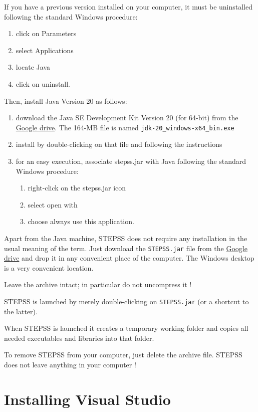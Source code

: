 If you have a previous version installed on your computer, it must be uninstalled following the standard Windows procedure:
\begin{enumerate}
\item click on Parameters
\item select Applications
\item locate Java
\item click on uninstall.
\end{enumerate}

Then, install Java Version 20 as follows:
\begin{enumerate}
\item download the Java SE Development Kit Version 20 (for 64-bit) from the \hyperlink{Google}{Google drive}. The 164-MB file is named {\tt jdk-20\_windows-x64\_bin.exe}
\item install by double-clicking on that file and following the instructions
\item for an easy execution, associate stepss.jar with Java following the standard Windows procedure:
\begin{enumerate}
\item right-click on the stepss.jar icon
\item select open with
\item choose always use this application.
\end{enumerate}
\end{enumerate}
   
Apart from the Java machine, STEPSS does not require any installation in the usual meaning of the term.
Just download the {\tt STEPSS.jar} file from the \hyperlink{Google}{Google drive} and drop it in any convenient place of the computer. The Windows desktop is a very convenient location.

Leave the archive intact; in particular do not uncompress it !  

STEPSS is launched by merely double-clicking on {\tt STEPSS.jar} (or a shortcut to the latter). 

When STEPSS is launched it creates a temporary working folder and copies all needed executables and libraries into that folder.

To remove STEPSS from your computer, just delete the archive file. STEPSS does not leave anything in your computer !

\section{Installing Visual Studio}

